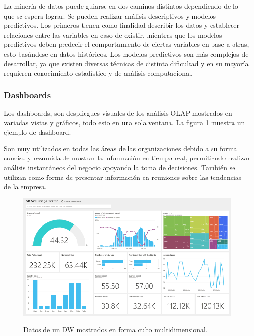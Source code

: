 \documentclass[letter,12pt,oneside]{report}
\begin{document}
La minería de datos puede guiarse en dos caminos distintos dependiendo de lo que se espera lograr. Se pueden realizar análisis descriptivos y modelos predictivos. Los primeros tienen como finalidad describir los datos y establecer relaciones entre las variables en caso de existir, mientras que los modelos predictivos deben predecir el comportamiento de ciertas variables en base a otras, esto basándose en datos históricos. Los modelos predictivos son más complejos de desarrollar, ya que existen diversas técnicas de distinta dificultad y en su mayoría requieren conocimiento estadístico y de análisis computacional.

\subsubsection{Dashboards}
Los dashboards, son despliegues visuales de los análisis OLAP mostrados en variadas vistas y gráficos, todo esto en una sola ventana. La figura \ref{dashboard} muestra un ejemplo de dashboard.

Son muy utilizados en todas las áreas de las organizaciones debido a su forma concisa y resumida de mostrar la información en tiempo real, permitiendo realizar análisis instantáneos del negocio apoyando la toma de decisiones. También se utilizan como forma de presentar información en reuniones sobre las tendencias de la empresa.

\begin{figure}[h]
\begin{center}
\includegraphics[scale=0.5]{images/dashboard.png}
\caption{Datos de un DW mostrados en forma cubo multidimensional.}
\label{dashboard}
\end{center}
\end{figure}
\end{document}
